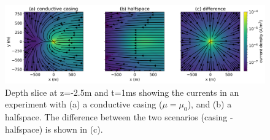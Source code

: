 \begin{figure}
    \begin{center}
    \includegraphics[width=\textwidth]{figures/currents-depth-slice.png}
    \end{center}
\caption{
    Depth slice at z=-2.5m and t=1ms showing the currents in an experiment with (a) a conductive casing ($\mu=\mu_0$),
    and (b) a halfspace. The difference between the two scenarios (casing - halfspace) is shown in (c).
}
\label{fig:currents-depth-slice}
\end{figure}



